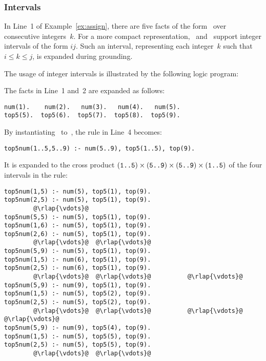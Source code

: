 \subsubsection{Intervals}\label{subsec:gringo:interval}

In Line~1 of Example~\ref{ex:assign},
there are five facts of the form~
over consecutive integers~$k$.
For a more compact representation,
\gringo\ and \clingo\ support integer intervals of the form $i$$j$.
Such an interval, representing each integer~$k$ such that $i\leq k\leq j$,
is expanded during grounding.

\begin{example}\label{ex:int}
The usage of integer intervals is illustrated by the following logic program:
%

%
The facts in Line~1 and~2 are expanded as follows:
%
\begin{lstlisting}[numbers=none]
num(1).    num(2).   num(3).   num(4).   num(5).
top5(5).  top5(6).  top5(7).  top5(8).  top5(9).
\end{lstlisting}
%
By instantiating~ to~,
the rule in Line~4 becomes:
%
\begin{lstlisting}[numbers=none]
top5num(1..5,5..9) :- num(5..9), top5(1..5), top(9).
\end{lstlisting}
%
It is expanded to the cross product
$(\texttt{\texttt{1}..\texttt{5}})\times
 (\texttt{\texttt{5}..\texttt{9}})\times
 (\texttt{\texttt{5}..\texttt{9}})\times
 (\texttt{\texttt{1}..\texttt{5}})$
of the four intervals in the rule:
%
\begin{lstlisting}[numbers=none,escapechar=@]
top5num(1,5) :- num(5), top5(1), top(9).
top5num(2,5) :- num(5), top5(1), top(9).
        @\rlap{\vdots}@
top5num(5,5) :- num(5), top5(1), top(9).
top5num(1,6) :- num(5), top5(1), top(9).
top5num(2,6) :- num(5), top5(1), top(9).
        @\rlap{\vdots}@  @\rlap{\vdots}@
top5num(5,9) :- num(5), top5(1), top(9).
top5num(1,5) :- num(6), top5(1), top(9).
top5num(2,5) :- num(6), top5(1), top(9).
        @\rlap{\vdots}@  @\rlap{\vdots}@          @\rlap{\vdots}@
top5num(5,9) :- num(9), top5(1), top(9).
top5num(1,5) :- num(5), top5(2), top(9).
top5num(2,5) :- num(5), top5(2), top(9).
        @\rlap{\vdots}@  @\rlap{\vdots}@          @\rlap{\vdots}@         @\rlap{\vdots}@
top5num(5,9) :- num(9), top5(4), top(9).
top5num(1,5) :- num(5), top5(5), top(9).
top5num(2,5) :- num(5), top5(5), top(9).
        @\rlap{\vdots}@  @\rlap{\vdots}@

\end{lstlisting}
\end{example}
